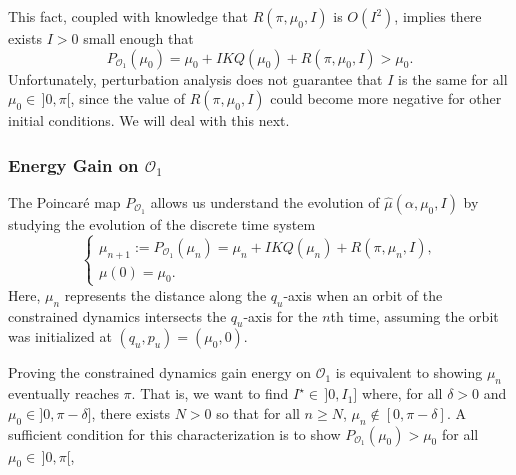 This fact, coupled with knowledge that \(R(\pi,\mu_0,I)\) is \(O(I^2)\),
implies there exists \(I > 0\) small enough that
\[
    P_{\mathcal{O}_1}(\mu_0) = \mu_0 + IKQ(\mu_0) + R(\pi,\mu_0,I) > \mu_0
    .
\]
Unfortunately, perturbation analysis does not guarantee 
that \(I\) is the same for all \(\mu_0 \in \, ]0,\pi[\), since the value of
\(R(\pi,\mu_0,I)\) could become more negative for other initial conditions.
We will deal with this next.

\subsubsection*{Energy Gain on \(\mathcal{O}_1\)}

The Poincar\'{e} map \(P_{\mathcal{O}_1}\) allows us understand the evolution of
\(\hat{\mu}(\alpha,\mu_0,I)\) by studying the evolution of the discrete time
system
\begin{equation}\label{eqn:muhat-discrete}
    \begin{cases}
        \mu_{n+1} := P_{\mathcal{O}_1}(\mu_n) 
        = \mu_n + I K Q(\mu_n) + R(\pi,\mu_n,I)
        , \\
        \mu(0) = \mu_0
        .
    \end{cases}
\end{equation}
Here, \(\mu_n\) represents the distance along the
\(q_u\)-axis when an orbit of the constrained dynamics intersects the
\(q_u\)-axis for the \(n\)th time, assuming the orbit was initialized at
\((q_u,p_u) = (\mu_0,0)\).

Proving the constrained dynamics gain energy on \(\mathcal{O}_1\) is equivalent to
showing \(\mu_n\) eventually reaches \(\pi\).
That is, we want to find \(I^\star \in\, ]0, I_1]\) where, for all 
\(\delta > 0\) and \(\mu_0 \in ]0,\pi-\delta]\), there exists \(N > 0\) so that
for all \(n \geq N\), \(\mu_n \notin [0,\pi-\delta]\).
A sufficient condition for this characterization is to show 
\(P_{\mathcal{O}_1}(\mu_0) > \mu_0\) for all \(\mu_0 \in\, ]0,\pi[\),

